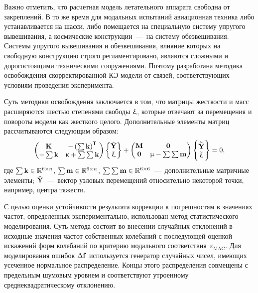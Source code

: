 Важно отметить, что расчетная модель летательного аппарата свободна от закреплений. В то же время для модальных испытаний авиационная техника либо устанавливается на шасси, либо помещается на специальную систему упругого вывешивания, а космические конструкции~---~на систему обезвешивания. Системы упругого вывешивания и обезвешивания, влияние которых на свободную конструкцию строго регламентировано, являются сложными и дорогостоящими техническими сооружениями. Поэтому разработана методика освобождения скорректированной КЭ-модели от связей, соответствующих условиям проведения эксперимента. 

Суть методики освобождения заключается в том, что матрицы жесткости и масс расширяются шестью степенями свободы $ \mathbf{\upxi} $, которые отвечают за перемещения и повороты модели как жесткого целого. Дополнительные элементы матриц рассчитываются следующим образом:
\begin{equation}
	\begin{pmatrix}
		\mathbf{K} & -\left( \sum \mathbf{k} \right) ^ \mathsf{T} \\
		 -\sum \mathbf{k} & \upkappa + \sum \sum \mathbf{k}
	\end{pmatrix}
	\begin{Bmatrix}
		\tilde{\mathbf{Y}} \\
		\upxi
	\end{Bmatrix}
	+
	\begin{pmatrix}
		\mathbf{M} & \mathbf{0} \\
		\mathbf{0} & \upmu - \sum \sum \mathbf{m}
	\end{pmatrix}
		\begin{Bmatrix}
		\ddot{\tilde{\mathbf{Y}}} \\
		\ddot{\upxi}
	\end{Bmatrix}
	= 0,
\end{equation}
где $ \sum \mathbf{k} \in \mathbb{R}^{6 \times n}$, $ \sum \mathbf{m} \in \mathbb{R}^{6 \times n}$, $ \sum \sum \mathbf{m} \in \mathbb{R}^{6 \times 6} $~---~дополнительные матричные элементы; $ \tilde{\mathbf{Y}} $~---~вектор узловых перемещений относительно некоторой точки, например, центра тяжести.

С целью оценки устойчивости результата коррекции к погрешностям в значениях частот, определенных экспериментально, использован метод статистического моделирования. Суть метода состоит во внесении случайных отклонений в исходные значения частот собственных колебаний с последующей оценкой искажений форм колебаний по критерию модального соответствия~$ \varepsilon_{\mathrm{MAC}} $. Для моделирования ошибок $\Delta \mathbf{f} $ используется генератор случайных чисел, имеющих усеченное нормальное распределение. Концы этого распределения совмещены с предельным шумовым уровнем и соответствуют утроенному среднеквадратическому отклонению. 

